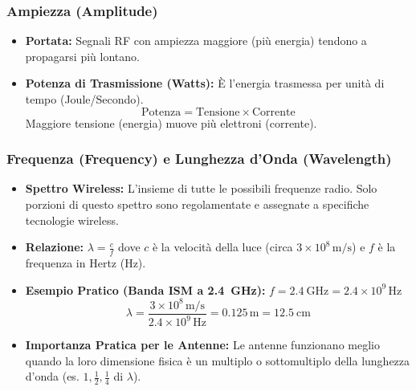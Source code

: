 \subsubsection{Ampiezza (Amplitude)}
\begin{itemize}
    \item \textbf{Portata:} Segnali RF con ampiezza maggiore (più energia) tendono a propagarsi più lontano.
    \item \textbf{Potenza di Trasmissione (Watts):} È l'energia trasmessa per unità di tempo (Joule/Secondo).
    \[ \text{Potenza} = \text{Tensione} \times \text{Corrente} \]
    Maggiore tensione (energia) muove più elettroni (corrente).
\end{itemize}

\subsubsection{Frequenza (Frequency) e Lunghezza d'Onda (Wavelength)}
\begin{itemize}
    \item \textbf{Spettro Wireless:} L'insieme di tutte le possibili frequenze radio. Solo porzioni di questo spettro sono regolamentate e assegnate a specifiche tecnologie wireless.
    \item \textbf{Relazione:} $\lambda = \frac{c}{f}$
    dove $c$ è la velocità della luce (circa $3 \times 10^8 \, \text{m/s}$) e $f$ è la frequenza in Hertz (Hz).
    \item \textbf{Esempio Pratico (Banda ISM a \SI{2.4}{\giga\hertz}):}
    $f = \SI{2.4}{\giga\hertz} = 2.4 \times 10^9 \, \text{Hz}$
    \[ \lambda = \frac{3 \times 10^8 \, \text{m/s}}{2.4 \times 10^9 \, \text{Hz}} = 0.125 \, \text{m} = \SI{12.5}{\centi\meter} \]
    \item \textbf{Importanza Pratica per le Antenne:} Le antenne funzionano meglio quando la loro dimensione fisica è un multiplo o sottomultiplo della lunghezza d'onda (es. $1, \frac{1}{2}, \frac{1}{4}$ di $\lambda$).
\end{itemize}
\begin{center}
\end{center}

